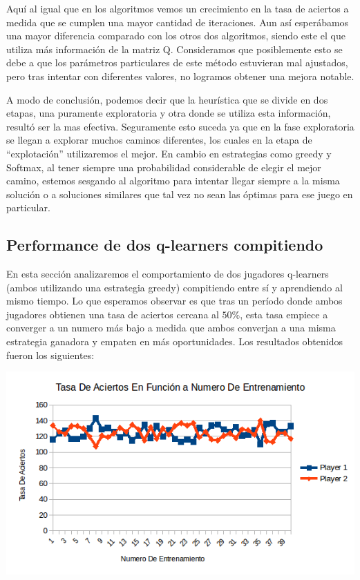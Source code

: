 Aquí al igual que en los algoritmos vemos un crecimiento en la tasa de aciertos a medida que se cumplen una mayor cantidad de iteraciones. Aun así esperábamos una mayor diferencia comparado con los otros dos algoritmos, siendo este el que utiliza más información de la matriz Q. Consideramos que posiblemente esto se debe a que los parámetros particulares de este método estuvieran mal ajustados, pero tras intentar con diferentes valores, no logramos obtener una mejora notable.

A modo de conclusión, podemos decir que la heurística que se divide en dos etapas, una puramente exploratoria y otra donde se utiliza esta información, resultó ser la mas efectiva. Seguramente esto suceda ya que en la fase exploratoria se llegan a explorar muchos caminos diferentes, los cuales en la etapa de ``explotación'' utilizaremos el mejor. En cambio en estrategias como greedy y Softmax, al tener siempre una probabilidad considerable de elegir el mejor camino, estemos sesgando al algoritmo para intentar llegar siempre a la misma solución o a soluciones similares que tal vez no sean las óptimas para ese juego en particular.

\subsection{Performance de dos q-learners compitiendo}

En esta sección analizaremos el comportamiento de dos jugadores q-learners (ambos utilizando una estrategia greedy) compitiendo entre sí y aprendiendo al mismo tiempo. Lo que esperamos observar es que tras un período donde ambos jugadores obtienen una tasa de aciertos cercana al $50 \%$, esta tasa empiece a converger a un numero más bajo a medida que ambos converjan a una misma estrategia ganadora y empaten en más oportunidades. Los resultados obtenidos fueron los siguientes:

\includegraphics[scale=0.5]{testing/qvsq.png}

